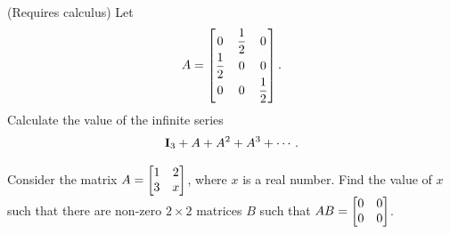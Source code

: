 \begin{pro}
(Requires calculus)
Let $$ A = \begin{bmatrix} 0 & \dfrac{1}{2} & 0 \cr \dfrac{1}{2}  &
0 & 0 \cr 0 & 0 & \dfrac{1}{2} \cr \end{bmatrix}. $$ Calculate the
value of the infinite series
$${\bf I}_3 + A + A^2 +A^3 + \cdots .  $$
\end{pro}




\begin{pro}
Consider the matrix $A=\begin{bmatrix}1 & 2 \cr 3 & x \end{bmatrix}$, where
$x$ is a real number. Find the value of $x$ such that there are non-zero $2\times 2 $ matrices $B$ such that $AB = \begin{bmatrix}0 & 0 \cr 0 & 0 \end{bmatrix}$.
\end{pro}


